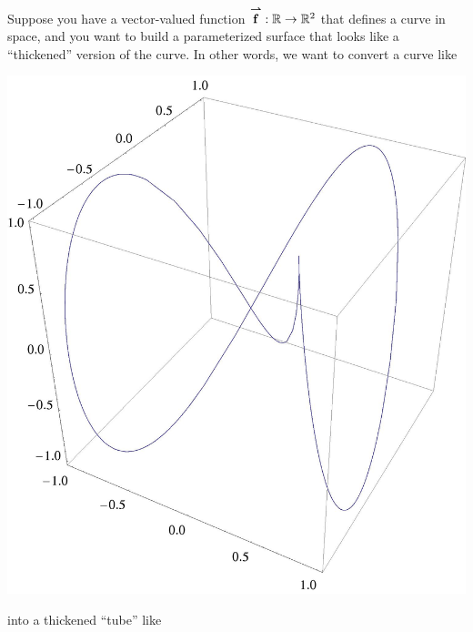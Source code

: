 \documentclass{ximera}
\begin{document}
Suppose you have a vector-valued function ${\overset{\boldsymbol{\rightharpoonup}}{\mathbf{f}}}:\mathbb R\to\mathbb R^2$ that
defines a curve in space, and you want to build a parameterized
surface that looks like a ``thickened'' version of the curve.  In
other words, we want to convert a curve like
\begin{image}
  \includegraphics{curve.jpg}
\end{image}
into a thickened ``tube'' like
\end{document}
